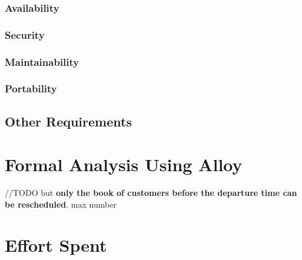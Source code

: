 \documentclass[a4paper,12pt]{report}
\begin{document}
\subsection{Availability}
\subsection{Security}
\subsection{Maintainability}
\subsection{Portability}


\section{Other Requirements}

\chapter{Formal Analysis Using Alloy}

//TODO but \textbf{only the book of customers before the departure time can be rescheduled}. 
max number

\chapter{Effort Spent}
\end{document}
